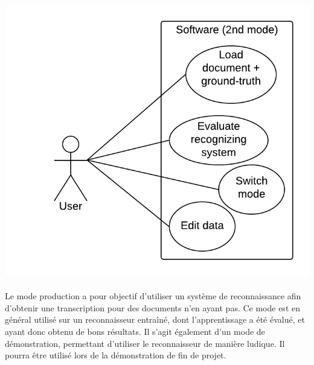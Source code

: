 \paragraph{}

\begin{mdframed}[frametitle={Figure 3 : Diagramme de cas d'utilisation (mode évaluation)}, innerbottommargin=10]
\begin{center}
\includegraphics[scale=0.6]{Usecase_2.png}
\end{center}
\end{mdframed}

\paragraph{}

Le mode production a pour objectif d’utiliser un système de reconnaissance afin d’obtenir une transcription pour des documents n’en ayant pas. Ce mode est en général utilisé sur un reconnaisseur entraîné, dont l’apprentissage a été évalué, et ayant donc obtenu de bons résultats. Il s’agit également d’un mode de démonstration, permettant d’utiliser le reconnaisseur de manière ludique. Il pourra être utilisé lors de la démonstration de fin de projet.

\paragraph{}

